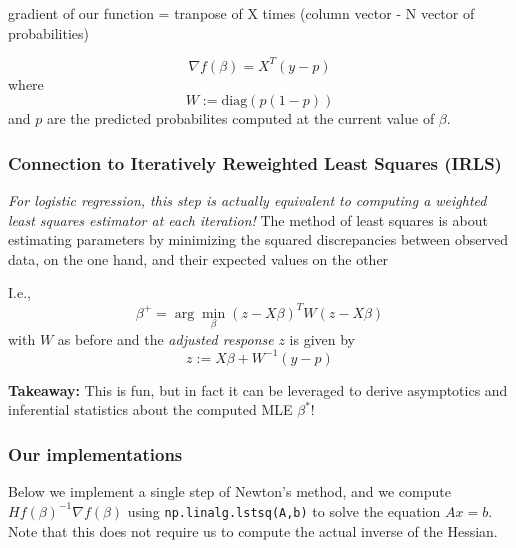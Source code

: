 \documentclass[11pt]{article}
\begin{document}
gradient of our function = tranpose of X times (column vector - N vector
of probabilities)

\[
\nabla f(\beta) = X^T(y-p)
\] where \[
W := \text{diag}\left(p(1-p)\right)
\] and \(p\) are the predicted probabilites computed at the current
value of \(\beta\).

\subsubsection{Connection to Iteratively Reweighted Least Squares
(IRLS)}\label{connection-to-iteratively-reweighted-least-squares-irls}

\emph{For logistic regression, this step is actually equivalent to
computing a weighted least squares estimator at each iteration!} The
method of least squares is about estimating parameters by minimizing the
squared discrepancies between observed data, on the one hand, and their
expected values on the other

I.e., \[
\beta^+ = \arg\min_\beta (z-X\beta)^TW(z-X\beta)
\] with \(W\) as before and the \emph{adjusted response} \(z\) is given
by \[
z := X\beta + W^{-1}(y-p)
\]

\textbf{Takeaway:} This is fun, but in fact it can be leveraged to
derive asymptotics and inferential statistics about the computed MLE
\(\beta^*\)!

\subsubsection{Our implementations}\label{our-implementations}

Below we implement a single step of Newton's method, and we compute
\(Hf(\beta)^{-1}\nabla f(\beta)\) using \texttt{np.linalg.lstsq(A,b)} to
solve the equation \(Ax = b\). Note that this does not require us to
compute the actual inverse of the Hessian.
\end{document}
